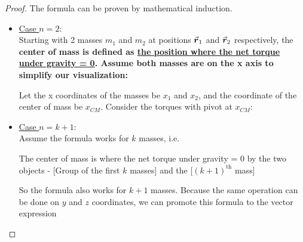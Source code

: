 \documentclass[class=article, crop=false, 12pt]{standalone}
\begin{document}
\begin{proof}
    The formula can be proven by mathematical induction.

    \begin{itemize}
        \item \ul{Case $n=2$}:\\
        Starting with 2 masses $m_1$ and $m_2$ at positions $\va*{r}_1$ and $\va*{r}_2$ respectively,
        the \bf{center of mass} is defined as \ul{the position where the net torque under gravity = 0}. 
        Assume both masses are on the x axis to simplify our visualization:


        Let the x coordinates of the masses be $x_1$ and $x_2$,
        and the coordinate of the center of mass be $x_{CM}$.
        Consider the torques with pivot at $x_{CM}$:

        \item \ul{Case $n=k+1$}:\\
        Assume the formula works for $k$ masses, i.e. 

        The center of mass is where the net torque under gravity = 0 by the two objects - 
        [Group of the first $k$ masses] and the [$(k+1)^\text{th}$ mass]

        So the formula also works for $k+1$ masses. 
        Because the same operation can be done on $y$ and $z$ coordinates, we can promote this formula to the vector expression

    \end{itemize}
    

    

\end{proof}
\end{document}
